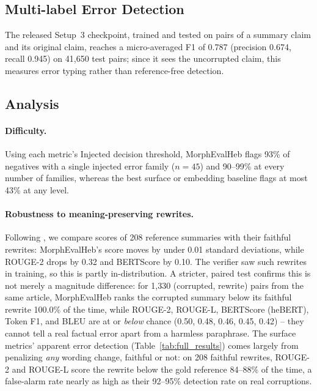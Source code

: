 \documentclass[11pt]{article}
\begin{document}
\subsection{Multi-label Error Detection}
\label{sec:res_multilabel}
The released Setup~3 checkpoint, trained and tested on pairs of a summary claim and its original claim, reaches a micro-averaged F1 of 0.787 (precision 0.674, recall 0.945) on 41,650 test pairs; since it sees the uncorrupted claim, this measures error typing rather than reference-free detection.

\subsection{Analysis}
\label{sec:analysis}
\paragraph{Difficulty.} Using each metric's Injected decision threshold, MorphEvalHeb flags 93\% of negatives with a single injected error family ($n{=}45$) and 90--99\% at every number of families, whereas the best surface or embedding baseline flags at most 43\% at any level.

\paragraph{Robustness to meaning-preserving rewrites.} Following \citet{mujahid-etal-2026-stress}, we compare scores of 208 reference summaries with their faithful rewrites: MorphEvalHeb's score moves by under 0.01 standard deviations, while ROUGE-2 drops by 0.32 and BERTScore by 0.10. The verifier saw such rewrites in training, so this is partly in-distribution. A stricter, paired test confirms this is not merely a magnitude difference: for 1,330 (corrupted, rewrite) pairs from the same article, MorphEvalHeb ranks the corrupted summary below its faithful rewrite 100.0\% of the time, while ROUGE-2, ROUGE-L, BERTScore (heBERT), Token F1, and BLEU are at or \emph{below} chance (0.50, 0.48, 0.46, 0.45, 0.42) -- they cannot tell a real factual error apart from a harmless paraphrase. The surface metrics' apparent error detection (Table~\ref{tab:full_results}) comes largely from penalizing \emph{any} wording change, faithful or not: on 208 faithful rewrites, ROUGE-2 and ROUGE-L score the rewrite below the gold reference 84--88\% of the time, a false-alarm rate nearly as high as their 92--95\% detection rate on real corruptions.
\end{document}
